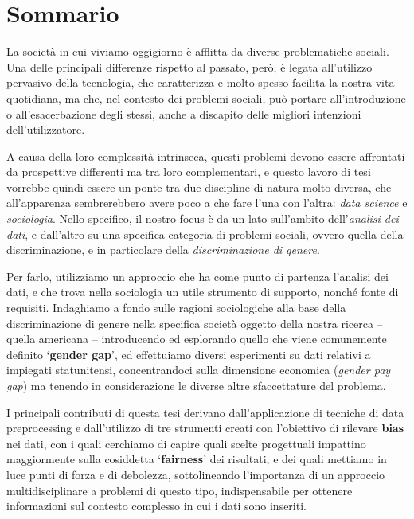 \newpage
\chapter*{Sommario}


La societ\`a in cui viviamo oggigiorno \`e afflitta da diverse problematiche sociali. Una delle principali differenze rispetto al passato, per\`o, \`e legata all'utilizzo pervasivo della tecnologia, che caratterizza e molto spesso facilita la nostra vita quotidiana, ma che, nel contesto dei problemi sociali, pu\`o portare all'introduzione o all'esacerbazione degli stessi, anche a discapito delle migliori intenzioni dell'utilizzatore.

A causa della loro complessit\`a intrinseca, questi problemi devono essere affrontati da prospettive differenti ma tra loro complementari, e questo lavoro di tesi vorrebbe quindi essere un ponte tra due discipline di natura molto diversa, che all'apparenza sembrerebbero avere poco a che fare l'una con l'altra: \textit{data science} e \textit{sociologia}. Nello specifico, il nostro focus \`e da un lato sull'ambito dell'\textit{analisi dei dati}, e dall'altro su una specifica categoria di problemi sociali, ovvero quella della discriminazione, e in particolare della \textit{discriminazione di genere}.

Per farlo, utilizziamo un approccio che ha come punto di partenza l'analisi dei dati, e che trova nella sociologia un utile strumento di supporto, nonch\'e fonte di requisiti. Indaghiamo a fondo sulle ragioni sociologiche alla base della discriminazione di genere nella specifica societ\`a oggetto della nostra ricerca -- quella americana -- introducendo ed esplorando quello che viene comunemente definito `\textbf{gender gap}', ed effettuiamo diversi esperimenti su dati relativi a impiegati statunitensi, concentrandoci sulla dimensione economica (\textit{gender pay gap}) ma tenendo in considerazione le diverse altre sfaccettature del problema.

I principali contributi di questa tesi derivano dall'applicazione di tecniche di data preprocessing e dall'utilizzo di tre strumenti creati con l'obiettivo di rilevare \textbf{bias} nei dati, con i quali cerchiamo di capire quali scelte progettuali impattino maggiormente sulla cosiddetta `\textbf{fairness}' dei risultati, e dei quali mettiamo in luce punti di forza e di debolezza, sottolineando l'importanza di un approccio multidisciplinare a problemi di questo tipo, indispensabile per ottenere informazioni sul contesto complesso in cui i dati sono inseriti.
